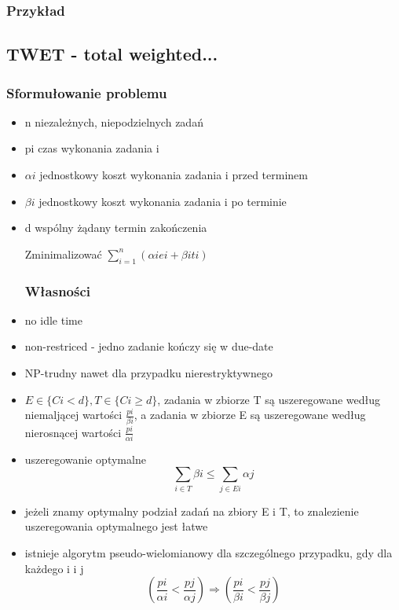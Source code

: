 \documentclass[12pt,a4paper]{article}
\begin{document}
\subsubsection{Przykład}
\subsection{TWET - total weighted...}
\subsubsection{Sformułowanie problemu}
\begin{itemize}
\item n niezależnych, niepodzielnych zadań
\item pi czas wykonania zadania i
\item $\alpha i$ jednostkowy koszt wykonania zadania i przed terminem
\item $\beta i$ jednostkowy koszt wykonania zadania i po terminie
\item d wspólny żądany termin zakończenia

Zminimalizować $\sum\limits_{i=1}^{n}(\alpha i ei + \beta iti)$
\subsubsection{Własności}
\item no idle time
\item non-restriced - jedno zadanie kończy się w due-date
\item NP-trudny nawet dla przypadku nierestryktywnego
\item $E \in \{ Ci<d \}, T \in\{Ci\geq d\}$, zadania w zbiorze T są uszeregowane według niemaljącej wartości $\frac{pi}{\beta i}$, a zadania w zbiorze E są uszeregowane według nierosnącej wartości $\frac{pi}{\alpha i}$
\item uszeregowanie optymalne \begin{equation}
\sum\limits_{i\in T} \beta i \leq \sum\limits_{j \in Ei} \alpha j
\end{equation}
\item jeżeli znamy optymalny podział zadań na zbiory E i T, to znalezienie uszeregowania optymalnego jest łatwe
\item istnieje algorytm pseudo-wielomianowy dla szczególnego przypadku, gdy dla każdego i i j \begin{equation}
(\frac{pi}{\alpha i} < \frac{pj}{\alpha j}) \Rightarrow (\frac{pi}{\beta i} < \frac{pj}{\beta j})
\end{equation}
\end{itemize}
\end{document}
